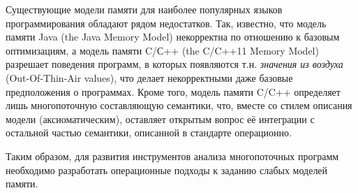 

Существующие модели памяти для наиболее популярных языков программирования обладают рядом недостатков.
Так, известно, что модель памяти Java (the Java Memory Model) некорректна по отношению
к базовым оптимизациям, а модель памяти C/С++ (the C/C++11 Memory Model) разрешает
поведения программ, в которых появляются т.н. \emph{значения из воздуха} (Out-Of-Thin-Air values),
что делает некорректными даже базовые предположения о программах.
Кроме того, модель памяти C/C++ определяет лишь многопоточную составляющую семантики, что, вместе со стилем
описания модели (аксиоматическим), оставляет открытым вопрос её интеграции с остальной частью семантики,
описанной в стандарте операционно.

Таким образом, для развития инструментов анализа многопоточных программ необходимо
разработать операционные подходы к заданию слабых моделей памяти.



